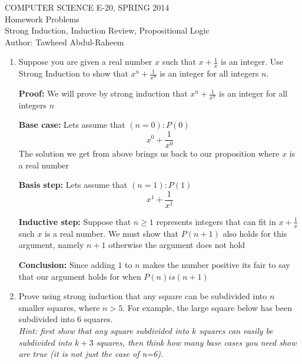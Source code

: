 \documentclass[12pt]{article}
\begin{document}
\begin{center}
    COMPUTER SCIENCE E-20, SPRING 2014 \\
    Homework Problems\\
    Strong Induction, Induction Review, Propositional Logic \\
    Author: Tawheed Abdul-Raheem
\end{center}

\smallskip

\begin{enumerate}

    \item Suppose you are given a real number $x$ such that $x + \frac{1}{x}$ is an integer.  Use Strong Induction to show that $x^n + \frac{1}{x^n}$ is an integer for all integers $n$.

        \textbf{Proof: }
        We will prove by strong induction that $x^n + \frac{1}{x^n}$ is an integer for all integers $n$

        \textbf{Base case: } Lets assume that $(n = 0): P(0)$
        \[ x^0 + \frac{1}{x^0}\]
        The solution we get from above brings us back to our proposition where $x$ is a real number

        \textbf{Basis step: } Lets assume that $(n = 1): P(1)$
        \[ x^1 + \frac{1}{x^1}\]

        \textbf{Inductive step: } Suppose that $n \geq 1$ represents integers that can fit in $x + \frac{1}{x}$ such $x$ is a real number. We must show that $P(n+1)$
        also holds for this argument, namely $n + 1$ otherwise the argument does not hold

        \textbf{Conclusion: } Since adding $1$ to $n$ makes the number positive its fair to say that our argument holds for when $P(n) is (n+1)$

    \item Prove using strong induction that any square can be subdivided into $n$ smaller squares, where $n>5$. For example, the large square below has been subdivided into 6 squares.\\
        {\em Hint: first show that any square subdivided into $k$ squares can easily be subdivided into $k+3$ squares, then think how many base cases you need show are true (it is not just the case of n=6).}

        \begin{center}
\end{center}
\end{enumerate}
\end{document}
